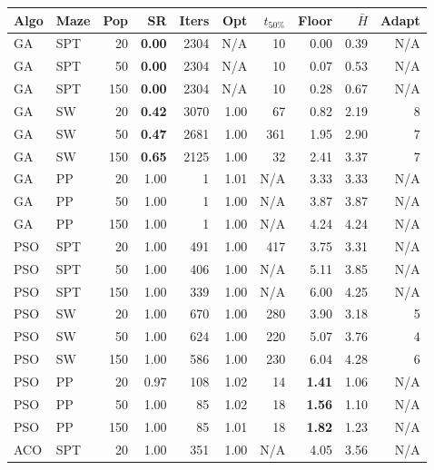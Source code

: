 \documentclass[11pt,a4paper]{article}
\begin{document}
    \begin{table}[ht]
        \centering
        \small
        \begin{tabular}{llrrrrrrrr}
            \toprule
            Algo & Maze & Pop & SR & Iters & Opt & $t_{50\%}$ & Floor & $\bar{H}$ & Adapt \\
            \midrule
            GA & SPT & 20 & \textbf{0.00} & 2304 & N/A & 10 & 0.00 & 0.39 & N/A \\
            GA & SPT & 50 & \textbf{0.00} & 2304 & N/A & 10 & 0.07 & 0.53 & N/A \\
            GA & SPT & 150 & \textbf{0.00} & 2304 & N/A & 10 & 0.28 & 0.67 & N/A \\
            GA & SW & 20 & \textbf{0.42} & 3070 & 1.00 & 67 & 0.82 & 2.19 & 8 \\
            GA & SW & 50 & \textbf{0.47} & 2681 & 1.00 & 361 & 1.95 & 2.90 & 7 \\
            GA & SW & 150 & \textbf{0.65} & 2125 & 1.00 & 32 & 2.41 & 3.37 & 7 \\
            GA & PP & 20 & 1.00 & 1 & 1.01 & N/A & 3.33 & 3.33 & N/A \\
            GA & PP & 50 & 1.00 & 1 & 1.00 & N/A & 3.87 & 3.87 & N/A \\
            GA & PP & 150 & 1.00 & 1 & 1.00 & N/A & 4.24 & 4.24 & N/A \\
            \midrule
            PSO & SPT & 20 & 1.00 & 491 & 1.00 & 417 & 3.75 & 3.31 & N/A \\
            PSO & SPT & 50 & 1.00 & 406 & 1.00 & N/A & 5.11 & 3.85 & N/A \\
            PSO & SPT & 150 & 1.00 & 339 & 1.00 & N/A & 6.00 & 4.25 & N/A \\
            PSO & SW & 20 & 1.00 & 670 & 1.00 & 280 & 3.90 & 3.18 & 5 \\
            PSO & SW & 50 & 1.00 & 624 & 1.00 & 220 & 5.07 & 3.76 & 4 \\
            PSO & SW & 150 & 1.00 & 586 & 1.00 & 230 & 6.04 & 4.28 & 6 \\
            PSO & PP & 20 & 0.97 & 108 & 1.02 & 14 & \textbf{1.41} & 1.06 & N/A \\
            PSO & PP & 50 & 1.00 & 85 & 1.02 & 18 & \textbf{1.56} & 1.10 & N/A \\
            PSO & PP & 150 & 1.00 & 85 & 1.01 & 18 & \textbf{1.82} & 1.23 & N/A \\
            \midrule
            ACO & SPT & 20 & 1.00 & 351 & 1.00 & N/A & 4.05 & 3.56 & N/A \\

\end{tabular}
\end{table}
\end{document}
